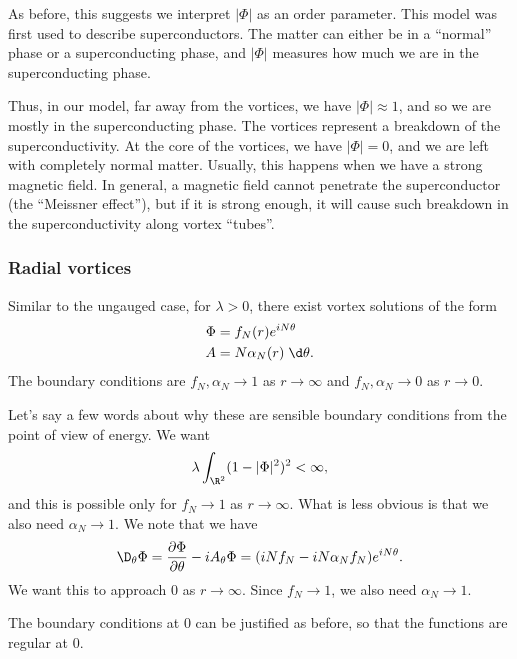 \documentclass[a4paper]{article}
\begin{document}
As before, this suggests we interpret $|\Phi|$ as an order parameter. This model was first used to describe superconductors. The matter can either be in a ``normal'' phase or a superconducting phase, and $|\Phi|$ measures how much we are in the superconducting phase.

Thus, in our model, far away from the vortices, we have $|\Phi| \approx 1$, and so we are mostly in the superconducting phase. The vortices represent a breakdown of the superconductivity. At the core of the vortices, we have $|\Phi| = 0$, and we are left with completely normal matter. Usually, this happens when we have a strong magnetic field. In general, a magnetic field cannot penetrate the superconductor (the ``Meissner effect''), but if it is strong enough, it will cause such breakdown in the superconductivity along vortex ``tubes''.

\subsubsection*{Radial vortices}
Similar to the ungauged case, for $\lambda > 0$, there exist vortex solutions of the form
\begin{align*}
  \Phi &= f_N(r) e^{iN\theta}\\
  A &= N \alpha_N(r) \;\d \theta.
\end{align*}
The boundary conditions are $f_N, \alpha_N \to 1$ as $r \to \infty$ and $f_N, \alpha_N\to 0$ as $r \to 0$.

Let's say a few words about why these are sensible boundary conditions from the point of view of energy. We want
\[
  \lambda \int_{\R^2} (1 - |\Phi|^2)^2 < \infty,
\]
and this is possible only for $f_N \to 1$ as $r \to \infty$. What is less obvious is that we also need $\alpha_N \to 1$. We note that we have
\[
  \D_\theta \Phi = \frac{\partial \Phi}{\partial \theta} - i A_\theta \Phi = (iN f_N - iN \alpha_N f_N) e^{iN\theta}.
\]
We want this to approach $0$ as $r \to \infty$. Since $f_N \to 1$, we also need $\alpha_N \to 1$.

The boundary conditions at $0$ can be justified as before, so that the functions are regular at $0$.
\end{document}
